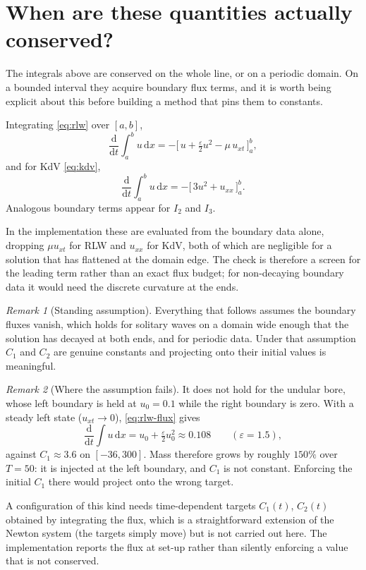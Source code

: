 \documentclass[11pt,a4paper]{article}
\theoremstyle{remark}
\newtheorem{remark}{Remark}
\newcommand{\dx}{\,\mathrm{d}x}
\begin{document}
\section{When are these quantities actually conserved?}

The integrals above are conserved on the whole line, or on a periodic domain.
On a bounded interval they acquire boundary flux terms, and it is worth being
explicit about this before building a method that pins them to constants.

Integrating \eqref{eq:rlw} over $[a,b]$,
\begin{equation}
\frac{\mathrm d}{\mathrm dt}\int_a^b u \dx
= -\Big[\,u + \tfrac{\varepsilon}{2}u^2 - \mu\,u_{xt}\,\Big]_a^b ,
\label{eq:rlw-flux}
\end{equation}
and for KdV \eqref{eq:kdv},
\begin{equation}
\frac{\mathrm d}{\mathrm dt}\int_a^b u \dx
= -\Big[\,3u^2 + u_{xx}\,\Big]_a^b .
\end{equation}
Analogous boundary terms appear for $I_2$ and $I_3$.

In the implementation these are evaluated from the boundary data alone,
dropping $\mu u_{xt}$ for RLW and $u_{xx}$ for KdV, both of which are
negligible for a solution that has flattened at the domain edge. The check is
therefore a screen for the leading term rather than an exact flux budget; for
non-decaying boundary data it would need the discrete curvature at the ends.

\begin{remark}[Standing assumption]
\label{rem:flux}
Everything that follows assumes the boundary fluxes vanish, which holds for
solitary waves on a domain wide enough that the solution has decayed at both
ends, and for periodic data. Under that assumption $C_1$ and $C_2$ are genuine
constants and projecting onto their initial values is meaningful.
\end{remark}

\begin{remark}[Where the assumption fails]
\label{rem:bore-flux}
It does not hold for the undular bore, whose left boundary is held at
$u_0 = 0.1$ while the right boundary is zero. With a steady left state
($u_{xt}\to0$), \eqref{eq:rlw-flux} gives
\begin{equation}
\frac{\mathrm d}{\mathrm dt}\int u \dx
= u_0 + \tfrac{\varepsilon}{2}u_0^2 \approx 0.108
\qquad (\varepsilon = 1.5),
\end{equation}
against $C_1 \approx 3.6$ on $[-36,300]$. Mass therefore grows by roughly
$150\%$ over $T = 50$: it is injected at the left boundary, and $C_1$ is not
constant. Enforcing the initial $C_1$ there would project onto the wrong
target.

A configuration of this kind needs time-dependent targets $C_1(t)$, $C_2(t)$
obtained by integrating the flux, which is a straightforward extension of the
Newton system (the targets simply move) but is not carried out here. The
implementation reports the flux at set-up rather than silently enforcing a
value that is not conserved.
\end{remark}
\end{document}
